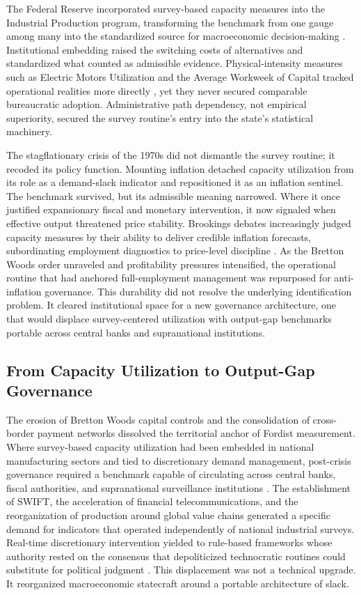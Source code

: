\documentclass[11pt]{article}
\begin{document}
The Federal Reserve incorporated survey-based capacity measures into the Industrial Production program, transforming the benchmark from one gauge among many into the standardized source for macroeconomic decision-making \citep{Board2017}. Institutional embedding raised the switching costs of alternatives and standardized what counted as admissible evidence. Physical-intensity measures such as Electric Motors Utilization and the Average Workweek of Capital tracked operational realities more directly \citep{Foss1963, TaubmanGottschalk1971}, yet they never secured comparable bureaucratic adoption. Administrative path dependency, not empirical superiority, secured the survey routine’s entry into the state’s statistical machinery.

The stagflationary crisis of the 1970s did not dismantle the survey routine; it recoded its policy function. Mounting inflation detached capacity utilization from its role as a demand-slack indicator and repositioned it as an inflation sentinel. The benchmark survived, but its admissible meaning narrowed. Where it once justified expansionary fiscal and monetary intervention, it now signaled when effective output threatened price stability. Brookings debates increasingly judged capacity measures by their ability to deliver credible inflation forecasts, subordinating employment diagnostics to price-level discipline \citep{KleinEtAl1973}. As the Bretton Woods order unraveled and profitability pressures intensified, the operational routine that had anchored full-employment management was repurposed for anti-inflation governance. This durability did not resolve the underlying identification problem. It cleared institutional space for a new governance architecture, one that would displace survey-centered utilization with output-gap benchmarks portable across central banks and supranational institutions.

\subsection{From Capacity Utilization to Output-Gap Governance}
\label{subsec:output_gap_governance}

The erosion of Bretton Woods capital controls and the consolidation of cross-border payment networks dissolved the territorial anchor of Fordist measurement. Where survey-based capacity utilization had been embedded in national manufacturing sectors and tied to discretionary demand management, post-crisis governance required a benchmark capable of circulating across central banks, fiscal authorities, and supranational surveillance institutions \citep{Jessop2002, Jessop2003, Konings2007}. The establishment of SWIFT, the acceleration of financial telecommunications, and the reorganization of production around global value chains generated a specific demand for indicators that operated independently of national industrial surveys. Real-time discretionary intervention yielded to rule-based frameworks whose authority rested on the consensus that depoliticized technocratic routines could substitute for political judgment \citep{SaadFilho2018}. This displacement was not a technical upgrade. It reorganized macroeconomic statecraft around a portable architecture of slack.
\end{document}
